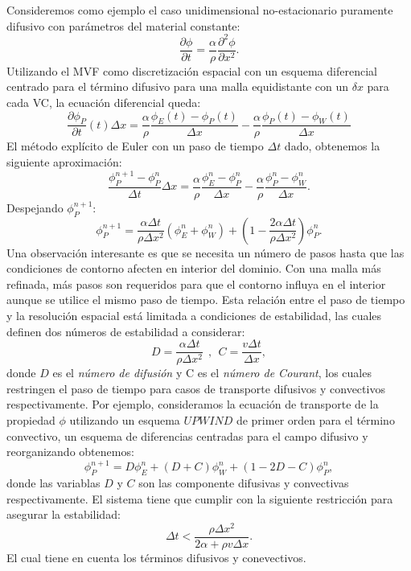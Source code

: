 \documentclass[a4paper,10pt, oneside]{book}
\begin{document}
Consideremos como ejemplo el caso unidimensional no-estacionario puramente difusivo con parámetros del material constante:
\begin{equation}
	\frac{\partial \phi}{\partial t} = \frac{\alpha }{\rho} \frac{\partial^2 \phi}{\partial x^2}.
	\label{eq:5-5}
\end{equation}
Utilizando el MVF como discretización espacial con un esquema diferencial centrado para el término difusivo para una malla equidistante con un $\delta x$ para cada VC, la ecuación diferencial queda:
\begin{equation}
	\frac{\partial \phi_P}{\partial t}(t) \Delta x = \frac{\alpha}{\rho} \frac{\phi_E(t) - \phi_P(t)}{\Delta x} - \frac{\alpha}{\rho} \frac{\phi_P (t) - \phi_W(t)}{\Delta x}
	\label{eq:5-6}
\end{equation}
El método explícito de Euler con un paso de tiempo $\Delta t$ dado, obtenemos la siguiente aproximación:
\begin{equation}
	\frac{\phi_P^{n+1} - \phi_P^n}{\Delta t} \Delta x= \frac{\alpha}{\rho} \frac{\phi_E^n - \phi_P^n}{\Delta x} - \frac{\alpha}{\rho} \frac{\phi_P^n - \phi_W^n}{\Delta x}. \nonumber
\end{equation}
Despejando $\phi_P^{n+1}$:
\begin{equation}
	\phi_P^{n+1} = \frac{\alpha \Delta t}{\rho \Delta x^2}(\phi_E^n + \phi_W^n) + \left( 1- \frac{2 \alpha \Delta t}{ \rho \Delta x^2} \right) \phi_P^n. \nonumber
\end{equation}
Una observación interesante es que se necesita un número de pasos hasta que las condiciones de contorno afecten en interior del dominio. Con una malla más refinada, más pasos son requeridos para que el contorno influya en el interior aunque se utilice el mismo paso de tiempo. Esta relación entre el paso de tiempo y la resolución espacial está limitada a condiciones de estabilidad, las cuales definen dos números de estabilidad a considerar:
\begin{equation}
	D = \frac{\alpha \Delta t}{\rho \Delta x^2} ~~ , ~~ C = \frac{v \Delta t}{\Delta x}, \nonumber
\end{equation}
donde $D$ es el \textit{número de difusión} y C es el \textit{número de Courant}, los cuales restringen el paso de tiempo para casos de transporte difusivos y convectivos respectivamente. Por ejemplo, consideramos la ecuación de transporte de la propiedad $\phi$ utilizando un esquema $UPWIND$ de primer orden para el término convectivo, un esquema de diferencias centradas para el campo difusivo y reorganizando obtenemos:
\begin{equation}
	\phi^{n+1}_P = D\phi_E^n + (D + C) \phi_W^n + (1-2D-C)\phi_P^n, \nonumber
\end{equation}
donde las variablas $D$ y $C$ son las componente difusivas y convectivas respectivamente. El sistema tiene que cumplir con la siguiente restricción para asegurar la estabilidad:
\begin{equation}
	\Delta t < \frac{\rho \Delta x^2}{2\alpha + \rho v \Delta x}. \nonumber
\end{equation}
El cual tiene en cuenta los términos difusivos y conevectivos.
\end{document}
